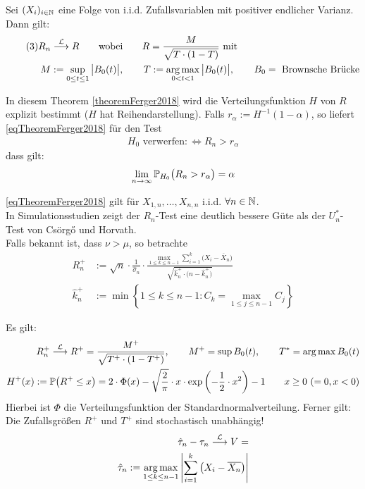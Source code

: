 \begin{thm}\label{theoremFerger2018} %
	Sei $(X_i)_{i\in\mathbb{N}}$ eine Folge von i.i.d. Zufallsvariablen mit positiver endlicher Varianz. Dann gilt:
	\begin{align}\label{eqTheoremFerger2018}\tag{3}
		R_n&\stackrel{\mathcal{L}}{\longrightarrow} R
		\qquad\text{wobei}\qquad
		R=\frac{M}{\sqrt{T\cdot(1-T)}}\text{ mit }\\
		M&:=\sup\limits_{0\leq t\leq 1}\big|B_0(t)\big|\nonumber,\qquad
		T:=\operatorname*{arg\,max}\limits_{0<t<1}\big|B_0(t)\big|,\qquad
		B_0=\text{ Brownsche Brücke}\nonumber
	\end{align}
\end{thm}

In diesem Theorem \ref{theoremFerger2018} wird die Verteilungsfunktion $H$ von $R$ explizit bestimmt ($H$ hat Reihendarstellung).
Falls $r_\alpha:=H^{-1}(1-\alpha)$, so liefert \eqref{eqTheoremFerger2018} für den Test
\begin{align*}
	H_0\text{ verwerfen}:\Longleftrightarrow R_n>r_\alpha
\end{align*}
dass gilt:
\begin{align*}
	\lim\limits_{n\to\infty}\mathbb{P}_{H_0}\big(R_n>r_\alpha\big)=\alpha
\end{align*}

\begin{bemerkung}
	\eqref{eqTheoremFerger2018} gilt für $X_{1,n},\ldots,X_{n,n}$ i.i.d. $\forall n\in\mathbb{N}$.\\
	In Simulationsstudien zeigt der $R_n$-Test eine deutlich bessere Güte als der $U_n^\ast$-Test von Csörgő und Horvath.\\
	Falls bekannt ist, dass $\nu>\mu$, so betrachte
	\begin{align*}
		R_n^+&:=\sqrt{n}\cdot\frac{1}{\hat{\sigma}_n}\cdot\frac{\max\limits_{1\leq k\leq n-1}\sum\limits_{i=1}^k\big(X_i-\overline{X}_n\big)}{\sqrt{\hat{k}_n^+\cdot\big(n-\hat{k}_n^+\big)}}\\
		\hat{k}_n^+&:=\min\left\lbrace 1\leq k\leq n-1:C_k=\max\limits_{1\leq j\leq n-1}C_j\right\rbrace
	\end{align*}
\end{bemerkung}

Es gilt:
\begin{align*}
	R_n^+\stackrel{\mathcal{L}}{\longrightarrow} R^+=\frac{M^+}{\sqrt{T^+\cdot(1-T^+)}},\qquad
	M^+=\sup\limits B_0(t),\qquad
	T^*=\operatorname*{arg\,max}\limits B_0(t)\\
	H^+(x):=\mathbb{P}\big(R^+\leq x\big)=2\cdot\Phi(x)-\sqrt{\frac{2}{\pi}}\cdot x\cdot\exp\left(-\frac{1}{2}\cdot x^2\right)-1\qquad x\geq0~(=0, x<0)
\end{align*}
Hierbei ist $\Phi$ die Verteilungsfunktion der Standardnormalverteilung. Ferner gilt:\\
Die Zufallsgrößen $R^+$ und $T^+$ sind stochastisch unabhängig!
\begin{align*}
	\hat{\tau}_n-\tau_n\stackrel{\mathcal{L}}{\longrightarrow}V=\\
	\hat{\tau}_n:=\operatorname*{arg\,max}\limits_{1\leq k\leq n-1}\left|\sum\limits_{i=1}^k\big(X_i-\overline{X_n}\big)\right|
\end{align*}

